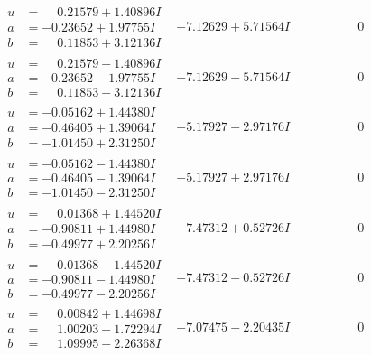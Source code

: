 \documentclass[1p]{elsarticle_modified}
\theoremstyle{definition}
\begin{document}
$$\begin{array}{c|c|c}
\begin{aligned}
u &= \phantom{-}0.21579 + 1.40896 I \\
a &= -0.23652 + 1.97755 I \\
b &= \phantom{-}0.11853 + 3.12136 I\end{aligned}
 & -7.12629 + 5.71564 I & \phantom{-0.000000 } 0 \\ \hline\begin{aligned}
u &= \phantom{-}0.21579 - 1.40896 I \\
a &= -0.23652 - 1.97755 I \\
b &= \phantom{-}0.11853 - 3.12136 I\end{aligned}
 & -7.12629 - 5.71564 I & \phantom{-0.000000 } 0 \\ \hline\begin{aligned}
u &= -0.05162 + 1.44380 I \\
a &= -0.46405 + 1.39064 I \\
b &= -1.01450 + 2.31250 I\end{aligned}
 & -5.17927 - 2.97176 I & \phantom{-0.000000 } 0 \\ \hline\begin{aligned}
u &= -0.05162 - 1.44380 I \\
a &= -0.46405 - 1.39064 I \\
b &= -1.01450 - 2.31250 I\end{aligned}
 & -5.17927 + 2.97176 I & \phantom{-0.000000 } 0 \\ \hline\begin{aligned}
u &= \phantom{-}0.01368 + 1.44520 I \\
a &= -0.90811 + 1.44980 I \\
b &= -0.49977 + 2.20256 I\end{aligned}
 & -7.47312 + 0.52726 I & \phantom{-0.000000 } 0 \\ \hline\begin{aligned}
u &= \phantom{-}0.01368 - 1.44520 I \\
a &= -0.90811 - 1.44980 I \\
b &= -0.49977 - 2.20256 I\end{aligned}
 & -7.47312 - 0.52726 I & \phantom{-0.000000 } 0 \\ \hline\begin{aligned}
u &= \phantom{-}0.00842 + 1.44698 I \\
a &= \phantom{-}1.00203 - 1.72294 I \\
b &= \phantom{-}1.09995 - 2.26368 I\end{aligned}
 & -7.07475 - 2.20435 I & \phantom{-0.000000 } 0 \\ \hline\begin{aligned}

\end{aligned}
\end{array}$$
\end{document}
